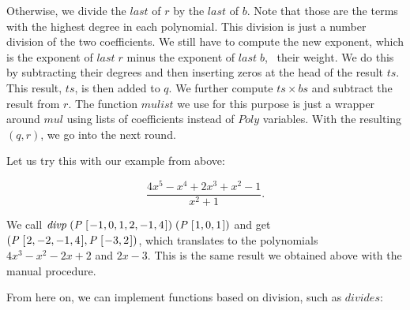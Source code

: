 \documentclass[tikz]{scrreprt}
\newcommand{\Conid}[1]{\mathit{#1}}
\newcommand{\Varid}[1]{\mathit{#1}}
\begin{document}
Otherwise, we divide the \ensuremath{\Varid{last}} of $r$ by the \ensuremath{\Varid{last}} of $b$.
Note that those are the terms with the highest degree
in each polynomial.
This division is just a number division of the two
coefficients. We still have to compute the new exponent,
which is the exponent of \ensuremath{\Varid{last}\;\Varid{r}} minus the exponent of 
\ensuremath{\Varid{last}\;\Varid{b}}, \ie\ their weight. We do this by subtracting
their degrees and then inserting zeros 
at the head of the result \ensuremath{\Varid{ts}}.
This result, \ensuremath{\Varid{ts}}, is then added to $q$.
We further compute $ts \times bs$ and subtract
the result from $r$. The function \ensuremath{\Varid{mulist}} we use for this purpose
is just a wrapper around \ensuremath{\Varid{mul}} using
lists of coefficients instead of \ensuremath{\Conid{Poly}} variables.
With the resulting $(q,r)$, we go into the next round.

Let us try this with our example from above: 

\[
\frac{4x^5 - x^4 + 2x^3 + x^2 - 1}{x^2 + 1}.
\]

We call \ensuremath{\Varid{divp}\;(\Conid{P}\;[\mskip1.5mu \mathbin{-}\mathrm{1},\mathrm{0},\mathrm{1},\mathrm{2},\mathbin{-}\mathrm{1},\mathrm{4}\mskip1.5mu])\;(\Conid{P}\;[\mskip1.5mu \mathrm{1},\mathrm{0},\mathrm{1}\mskip1.5mu])} and get
\ensuremath{(\Conid{P}\;[\mskip1.5mu \mathrm{2},\mathbin{-}\mathrm{2},\mathbin{-}\mathrm{1},\mathrm{4}\mskip1.5mu],\Conid{P}\;[\mskip1.5mu \mathbin{-}\mathrm{3},\mathrm{2}\mskip1.5mu])}, which translates to the polynomials
$4x^3-x^2-2x+2$ and $2x - 3$. 
This is the same result we obtained above 
with the manual procedure.


From here on, we can implement functions based on division,
such as \ensuremath{\Varid{divides}}:
\end{document}
